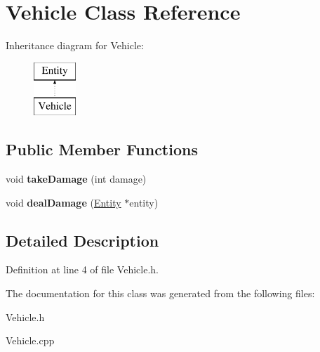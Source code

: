 \hypertarget{classVehicle}{}\section{Vehicle Class Reference}
\label{classVehicle}
Inheritance diagram for Vehicle\+:\begin{figure}[H]
\begin{center}
\leavevmode
\includegraphics[height=2.000000cm]{classVehicle}
\end{center}
\end{figure}
\subsection*{Public Member Functions}
\begin{DoxyCompactItemize}
\item 
\mbox{\label{classVehicle_ae30a3d13e4d254993acf808a94fdff8d}} 
void {\bfseries take\+Damage} (int damage)
\item 
\mbox{\label{classVehicle_a8a89569fb092d60bbb172ecd0d4ef4d1}} 
void {\bfseries deal\+Damage} (\hyperlink{classEntity}{Entity} $\ast$entity)
\end{DoxyCompactItemize}


\subsection{Detailed Description}


Definition at line 4 of file Vehicle.\+h.



The documentation for this class was generated from the following files\+:\begin{DoxyCompactItemize}
\item 
Vehicle.\+h\item 
Vehicle.\+cpp\end{DoxyCompactItemize}
